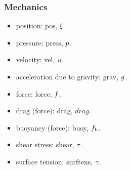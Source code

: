 \subsubsection{Mechanics}
\begin{itemize}
\item position: pos, $\xi$.
\item pressure: press, $p$.
\item velocity: vel, $u$.
\item acceleration due to gravity: grav, $g$.
\item force: force, $f$.
\item drag (force): drag, $drag$.
\item buoyancy (force): buoy, $f_\text{b}$.
\item shear stress: shear, $\tau$.
\item surface tension: surftens, $\gamma$.
\end{itemize}


